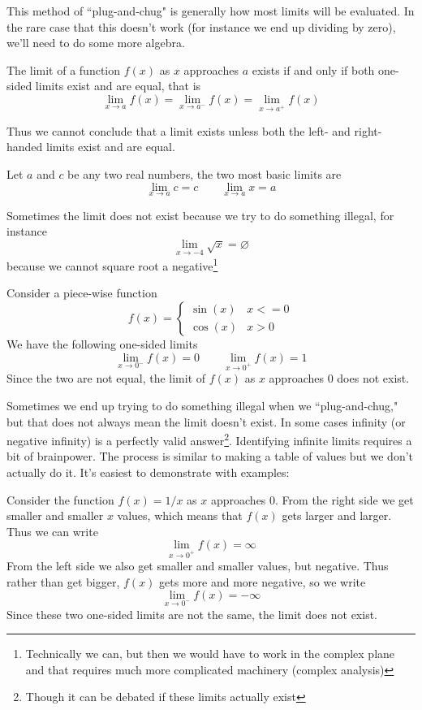 This method of ``plug-and-chug" is generally how most limits will be evaluated. In the rare case that this doesn't work (for instance we end up dividing by zero), we'll need to do some more algebra.

\begin{theorem}
The limit of a function $f(x)$ as $x$ approaches $a$ exists if and only if both one-sided limits exist and are equal, that is
\[ \lim_{x \to a} f(x) = \lim_{x \to a^-} f(x) = \lim_{x \to a^+} f(x) \]
\end{theorem}

Thus we cannot conclude that a limit exists unless both the left- and right-handed limits exist and are equal. 

\begin{example}
	Let $a$ and $c$ be any two real numbers, the two most basic limits are
	\[ \lim_{x \to a} c = c \qquad \lim_{x \to a} x = a \]
\end{example}


\begin{example}
	Sometimes the limit does not exist because we try to do something illegal, for instance
	\[ \lim_{x \to -4} \sqrt{x} = \varnothing \]
	because we cannot square root a negative\footnote{Technically we can, but then we would have to work in the complex plane and that requires much more complicated machinery (complex analysis)}
\end{example}

\begin{example}
	Consider a piece-wise function
	\[ f(x) = \begin{cases} 
	\sin(x) & x <= 0 \\ 
	\cos(x) & x > 0 
	\end{cases} \]
	We have the following one-sided limits
	\[ \lim_{x \to 0^-} f(x) = 0 \qquad \lim_{x \to 0^+} f(x)= 1 \]
	Since the two are not equal, the limit of $f(x)$ as $x$ approaches $0$ does not exist.
\end{example}

Sometimes we end up trying to do something illegal when we ``plug-and-chug," but that does not always mean the limit doesn't exist. In some cases infinity (or negative infinity) is a perfectly valid answer\footnote{Though it can be debated if these limits actually exist}. Identifying infinite limits requires a bit of brainpower. The process is similar to making a table of values but we don't actually do it. It's easiest to demonstrate with examples:

\begin{example}
	Consider the function $f(x) = 1/x$ as $x$ approaches 0. From the right side we get smaller and smaller $x$ values, which means that $f(x)$ gets larger and larger. Thus we can write
	\[ \lim_{x \to 0^+} f(x) = \infty \]
	From the left side we also get smaller and smaller values, but negative. Thus rather than get bigger, $f(x)$ gets more and more negative, so we write
	\[ \lim_{x \to 0^-} f(x) = -\infty \]
	Since these two one-sided limits are not the same, the limit does not exist.
\end{example}

